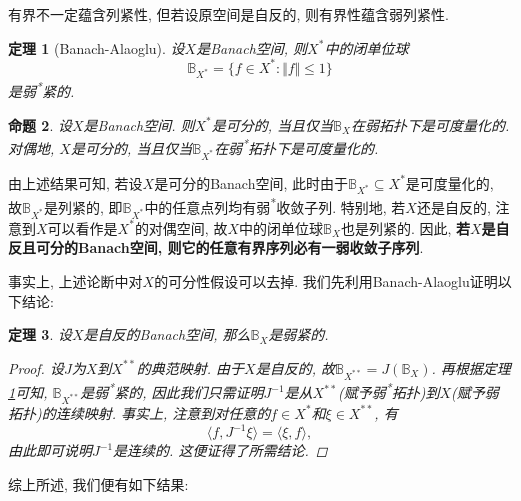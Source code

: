\documentclass[12pt,a4paper]{article}
\newtheorem{theorem}{定理}[section]
\newtheorem{proposition}[theorem]{命题}
\begin{document}
有界不一定蕴含列紧性, 但若设原空间是自反的, 则有界性蕴含弱列紧性. 

\begin{theorem}[Banach-Alaoglu]\label{Alaoglu}
    设$X$是Banach空间, 则$X^*$中的闭单位球
    \begin{equation*}
        \mathbb{B}_{X^*} = \{f \in X^*\colon \Vert f \Vert \leq 1\}
    \end{equation*}
    是弱\textsuperscript{*}紧的.
\end{theorem}

\begin{proposition}
    设$X$是Banach空间. 则$X^*$是可分的, 当且仅当$\mathbb{B}_X$在弱拓扑下是可度量化的.
    对偶地, $X$是可分的, 当且仅当$\mathbb{B}_{X^*}$在弱\textsuperscript{*}拓扑下是可度量化的.
\end{proposition}

由上述结果可知, 若设$X$是可分的Banach空间, 此时由于$\mathbb{B}_{X^*} \subseteq X^*$是可度量化的, 故$\mathbb{B}_{X^*}$是列紧的, 即$\mathbb{B}_{X^*}$中的任意点列均有弱\textsuperscript{*}收敛子列.
特别地, 若$X$还是自反的, 注意到$X$可以看作是$X^*$的对偶空间, 故$X$中的闭单位球$\mathbb{B}_X$也是列紧的. 
因此, \textbf{若$X$是自反且可分的Banach空间, 则它的任意有界序列必有一弱收敛子序列}.

事实上, 上述论断中对$X$的可分性假设可以去掉. 我们先利用Banach-Alaoglu证明以下结论:

\begin{theorem}\label{Kakutani}
    设$X$是自反的Banach空间, 那么$\mathbb{B}_X$是弱紧的. 
    \begin{proof}
        设$J$为$X$到$X^{**}$的典范映射. 由于$X$是自反的, 故$\mathbb{B}_{X^{**}} = J(\mathbb{B}_X)$.
        再根据定理\ref{Alaoglu}可知, $\mathbb{B}_{X^{**}}$是弱\textsuperscript{*}紧的, 因此我们只需证明$J^{-1}$是从$X^{**}$(赋予弱\textsuperscript{*}拓扑)到$X$(赋予弱拓扑)的连续映射.
        事实上, 注意到对任意的$f \in X^*$和$\xi \in X^{**}$, 有 
        \begin{equation*}
            \langle f, J^{-1}\xi\rangle = \langle \xi, f\rangle,
        \end{equation*}
        由此即可说明$J^{-1}$是连续的. 这便证得了所需结论.
    \end{proof}
\end{theorem}

综上所述, 我们便有如下结果:
\end{document}

